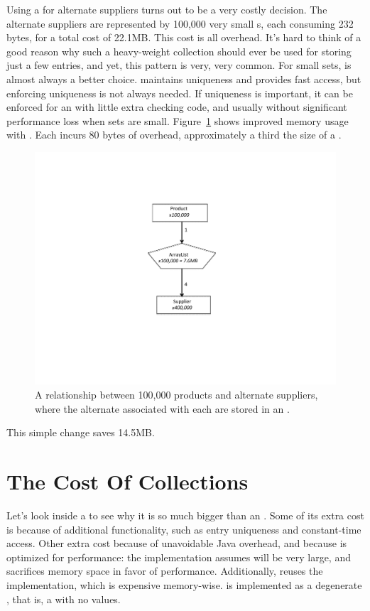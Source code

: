 Using a  for alternate suppliers turns out to be a
very costly decision. The alternate suppliers are represented by 100,000
very small s, each consuming 232 bytes, for a total cost of 22.1MB. 
This cost is all overhead.
It's hard to think of a good reason why such a heavy-weight collection should ever be used
 for storing just a few entries, and yet, this pattern is very, very common. For
 small sets,  is almost always a better choice.  maintains uniqueness
  and provides fast access, but enforcing uniqueness
is not always needed. If uniqueness is
important, it can be enforced for an  
 with  little extra checking code, and usually without significant performance
 loss when sets are small. Figure~\ref{fig:product-arraylist} shows improved
 memory usage with . Each  incurs 80 bytes of overhead,
approximately a third the size of a .
 \begin{figure}
  \centering
 \includegraphics[width=.80\textwidth]{part1/Figures/collections/product-arraylist.pdf}
 \caption{A relationship between 100,000 products and alternate suppliers,
 where the alternate  associated with each  are
 stored in an .}
  \label{fig:product-arraylist}
\end{figure}
This simple change saves 14.5MB. 


\section{The Cost Of Collections}
\label{sec:collectioncost}
Let's look inside a  to see why it is so much bigger than an
. Some of its extra cost is because of additional
functionality, such as entry uniqueness and constant-time access. Other extra
cost because of unavoidable Java overhead, and because
 is optimized for performance: the  implementation
assumes  will be very large, and sacrifices memory space in favor of performance. 
Additionally,  reuses the  implementation, which
is expensive memory-wise.  is implemented as a degenerate
, that is, a  with no values. 

